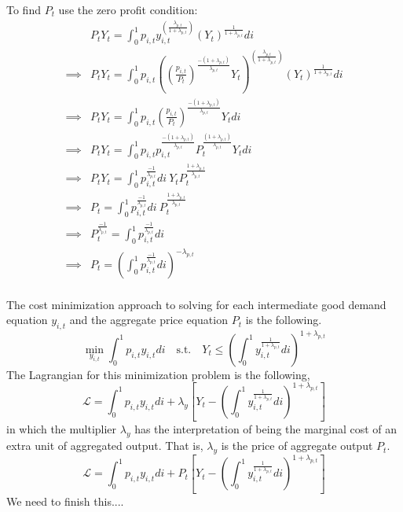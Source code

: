To find $P_{t}$ use the zero profit condition:
\begin{equation}
\begin{split}
& P_{t}Y_{t} = \int_{0}^{1}p_{i,t}y_{i,t}^{\left(\frac{\lambda_{p,t}}{1+\lambda_{p,t}}\right)}(Y_{t})^{\frac{1}{1+\lambda_{p,t}}}di \\
\implies & P_{t}Y_{t} = \int_{0}^{1}p_{i,t}\left(\left(\frac{p_{i,t}}{P_{t}}\right)^{\frac{-(1+\lambda_{p,t})}{\lambda_{p,t}}}Y_{t}\right)^{\left(\frac{\lambda_{p,t}}{1+\lambda_{p,t}}\right)}(Y_{t})^{\frac{1}{1+\lambda_{p,t}}}di \\
\implies & P_{t}Y_{t} = \int_{0}^{1}p_{i,t}\left(\frac{p_{i,t}}{P_{t}}\right)^{\frac{-(1+\lambda_{p,t})}{\lambda_{p,t}}}Y_{t}di \\
\implies & P_{t}Y_{t} = \int_{0}^{1}p_{i,t}p_{i,t}^{\frac{-(1+\lambda_{p,t})}{\lambda_{p,t}}}P_{t}^{\frac{(1+\lambda_{p,t})}{\lambda_{p,t}}}Y_{t}di \\
\implies & P_{t}Y_{t} = \int_{0}^{1}p_{i,t}^{\frac{-1}{\lambda_{p,t}}}di \:  Y_{t}P_{t}^{\frac{1+\lambda_{p,t}}{\lambda_{p,t}}} \\
\implies & P_{t} = \int_{0}^{1}p_{i,t}^{\frac{-1}{\lambda_{p,t}}}di \: P_{t}^{\frac{1+\lambda_{p,t}}{\lambda_{p,t}}} \\
\implies & P_{t}^{\frac{-1}{\lambda_{p,t}}} = \int_{0}^{1}p_{i,t}^{\frac{-1}{\lambda_{p,t}}}di \\
\implies & P_{t} = \left(\int_{0}^{1}p_{i,t}^{\frac{-1}{\lambda_{p,t}}}di\right)^{-\lambda_{p,t}} \\
\end{split}
\end{equation}

The cost minimization approach to solving for each intermediate good demand equation $y_{i,t}$ and the aggregate price equation $P_t$ is the following.
\begin{equation}\label{TAppEqObjCostMin}
   \min_{y_{i,t}} \int_{0}^{1}p_{i,t}y_{i,t}di \quad\text{s.t.}\quad Y_t \leq \left(\int_{0}^{1} y_{i,t}^{\frac{1}{1+\lambda_{p,t}}}di\right)^{1+\lambda_{p,t}}
\end{equation}
The Lagrangian for this minimization problem is the following,
\begin{equation}\label{TAppEqLagrCostMin}
   \mathcal{L} = \int_{0}^{1}p_{i,t}y_{i,t}di + \lambda_y\left[Y_t - \left(\int_{0}^{1} y_{i,t}^{\frac{1}{1+\lambda_{p,t}}}di\right)^{1+\lambda_{p,t}}\right]
\end{equation}
in which the multiplier $\lambda_y$ has the interpretation of being the marginal cost of an extra unit of aggregated output. That is, $\lambda_y$ is the price of aggregate output $P_t$.
\begin{equation}\label{TAppEqLagrCostMin2}
   \mathcal{L} = \int_{0}^{1}p_{i,t}y_{i,t}di + P_t\left[Y_t - \left(\int_{0}^{1} y_{i,t}^{\frac{1}{1+\lambda_{p,t}}}di\right)^{1+\lambda_{p,t}}\right]
\end{equation}
We need to finish this....


